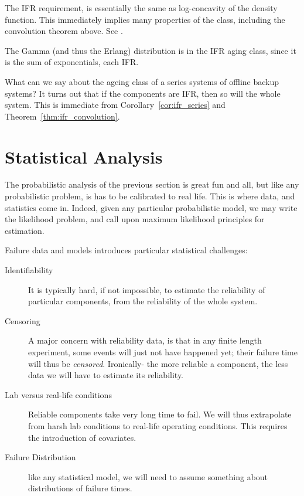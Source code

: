 \begin{extra}
The IFR requirement, is essentially the same as log-concavity of the density function.
This immediately implies many properties of the class, including the convolution theorem above.
See \cite{bagnoli_log-concave_2005}.
\end{extra}

\begin{example}
The Gamma (and thus the Erlang) distribution is in the IFR aging class, since it is the sum of exponentials, each IFR.
\end{example}

\begin{example}
What can we say about the ageing class of a series systems of offline backup systems? 
It turns out that if the components are IFR, then so will the whole system.
This is immediate from Corollary~\ref{cor:ifr_series} and Theorem~\ref{thm:ifr_convolution}.
\end{example}






\section{Statistical Analysis}
The probabilistic analysis of the previous section is great fun and all, but like any probabilistic problem, is has to be calibrated to real life. 
This is where data, and statistics come in.
Indeed, given any particular probabilistic model, we may write the likelihood problem, and call upon maximum likelihood principles for estimation.

Failure data and models introduces particular statistical challenges:
\begin{description}
\item [Identifiability] It is typically hard, if not impossible, to estimate the reliability of particular components, from the reliability of the whole system. 

\item [Censoring] A major concern with reliability data, is that in any finite length experiment, some events will just not have happened yet; their failure time will thus be \emph{censored}. Ironically- the more reliable a component, the less data we will have to estimate its reliability. 

\item [Lab versus real-life conditions] Reliable components take very long time to fail. We will thus extrapolate from harsh lab conditions to real-life operating conditions. This requires the introduction of covariates. 

\item [Failure Distribution] like any statistical model, we will need to assume something about distributions of failure times.

\end{description}






